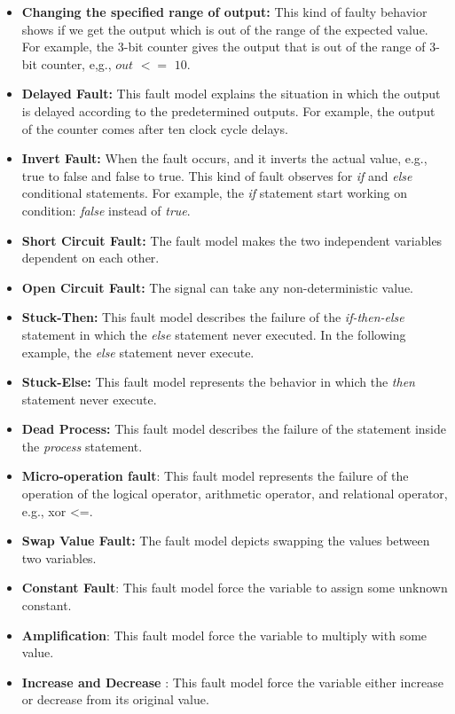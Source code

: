 \begin{itemize}
\begin{table}[tb!]
{\begin{tabular}{|c|c|c|c|}
 
\end{tabular}
}
\end{table}
\item \textbf{Changing the specified range of output:} This kind of faulty behavior shows if we get the output which is out of the range of the expected value. For example, the 3-bit counter gives the output that is out of the range of 3-bit counter, e,g., $out$ $<=$ $10$.
\item \textbf{Delayed Fault:} This fault model explains the situation in which the output is delayed according to the predetermined outputs. For example, the output of the counter comes after ten clock cycle delays.
\item \textbf{Invert Fault:} When the fault occurs, and it inverts the actual value, e.g., true to false and false to true. This kind of fault observes for \textit{if} and \textit{else}
conditional statements. For example, the \textit{if} statement start working on condition: \textit{false} instead of \textit{true}.

\item \textbf{Short Circuit Fault:} The fault model makes the two independent variables dependent on each other.

\item \textbf{Open Circuit Fault:} The signal can take any non-deterministic value.

\item \textbf{Stuck-Then:} This fault model describes the failure of the \textit{if-then-else} statement in which the \textit{else}
 statement never executed. In the following example, the \textit{else }
statement never execute.

\item \textbf{Stuck-Else:} This fault model represents the behavior in which the \textit{then} statement never execute.

\item \textbf{Dead Process:} This fault model describes the failure of the statement inside the \textit{process} statement.

\item \textbf{Micro-operation fault}: This fault model represents the failure of the operation of the logical operator, arithmetic operator, and relational operator, e.g., xor <=.   
\item \textbf{Swap Value Fault:} The fault model depicts swapping the values between two variables.

\item \textbf{Constant Fault}: This fault model force the variable to assign some unknown constant.

\item \textbf{Amplification}: This fault model force the variable to multiply with some value.

\item \textbf{Increase and Decrease }: This fault model force the variable either increase or decrease from its original value.
\end{itemize}



